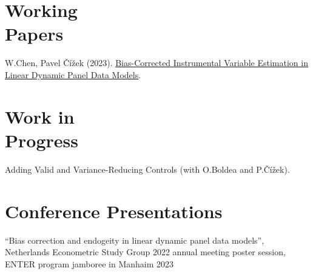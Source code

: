 \documentclass[margin,line]{res}
\newenvironment{list2}{
  \begin{list}{$\bullet$}{%
      \setlength{\itemsep}{0in}
      \setlength{\parsep}{0in} \setlength{\parskip}{0in}
      \setlength{\topsep}{0in} \setlength{\partopsep}{0in} 
      \setlength{\leftmargin}{0.2in}}}{\end{list}}
\begin{document}
\begin{resume}
\section{\sc Working \\ Papers}
W.Chen, Pavel \v{C}\'{i}\v{z}ek (2023). \href{https://pure.uvt.nl/ws/portalfiles/portal/82271980/2023-028.pdf}{\uline{Bias-Corrected Instrumental Variable Estimation in Linear Dynamic Panel Data Models}}.



\section{\sc Work in \\ Progress}
Adding Valid and Variance-Reducing Controls (with O.Boldea and P.\v{C}\'{i}\v{z}ek).

%

\section{\sc Conference Presentations}
``Bias correction and endogeity in linear dynamic panel data models'', 
Netherlands Econometric Study Group 2022 annual meeting poster session, ENTER program jamboree in Manhaim 2023 \vspace{-.3cm}


\end{resume}
\end{document}

